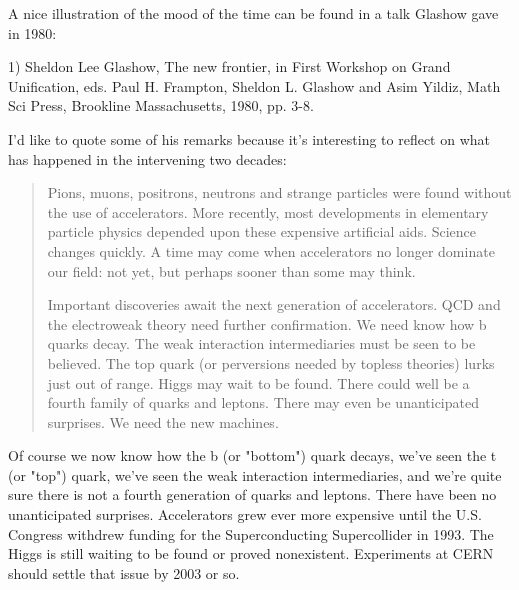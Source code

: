 A nice illustration of the mood of the time can be found in a talk
Glashow gave in 1980:

1) Sheldon Lee Glashow, The new frontier, in First Workshop on Grand
Unification, eds. Paul H. Frampton, Sheldon L. Glashow and Asim Yildiz,
Math Sci Press, Brookline Massachusetts, 1980, pp. 3-8.

I'd like to quote some of his remarks because it's interesting to
reflect on what has happened in the intervening two decades:

\begin{quote}
     Pions, muons, positrons, neutrons and strange particles were
     found without the use of accelerators.  More recently, most 
     developments in elementary particle physics depended upon these
     expensive artificial aids.  Science changes quickly.  A time may
     come when accelerators no longer dominate our field: not yet, but
     perhaps sooner than some may think.

     Important discoveries await the next generation of accelerators.
     QCD and the electroweak theory need further confirmation.  We need 
     know how b quarks decay.  The weak interaction intermediaries must
     be seen to be believed.  The top quark (or perversions needed by
     topless theories) lurks just out of range.  Higgs may wait to be 
     found.  There could well be a fourth family of quarks and leptons.
     There may even be unanticipated surprises.  We need the new machines.

\end{quote}

Of course we now know how the b (or "bottom") quark decays,
we've seen the t (or "top") quark, we've seen the weak
interaction intermediaries, and we're quite sure there is not a fourth
generation of quarks and leptons.  There have been no unanticipated
surprises.  Accelerators grew ever more expensive until the
U.S. Congress withdrew funding for the Superconducting Supercollider in
1993.  The Higgs is still waiting to be found or proved nonexistent.
Experiments at CERN should settle that issue by 2003 or so.

